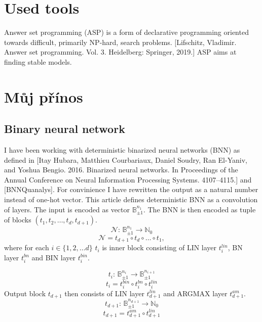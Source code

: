 \documentclass{fithesis}
\newcommand{\BB}{\mathbb{B}}
\newcommand{\NN}{\mathbb{N}}
\newcommand{\BNN}{\mathcal{N}}
\begin{document}
\chapter{Used tools}

Answer set programming (ASP) is a form of declarative
programming oriented towards difficult, primarily NP-hard,
search problems. [Lifschitz, Vladimir. Answer set programming. Vol. 3.
Heidelberg: Springer, 2019.] ASP aims at finding stable models.


\chapter{Můj přínos}

\section{Binary neural network}

I have been working with deterministic binarized neural networks (BNN)
as defined in [Itay Hubara, Matthieu Courbariaux, Daniel Soudry, Ran El-Yaniv, and Yoshua Bengio. 2016. Binarized neural networks. In Proceedings of the Annual Conference on Neural Information Processing Systems. 4107–4115.] and [BNNQuanalys].
For convinience I have rewritten the output as a natural number instead of
one-hot vector.
This article defines deterministic BNN as a convolution of layers.
The input is
encoded as vector $\BB_{\pm 1}^{n_1}$. The BNN is then encoded as tuple of blocks
$(t_1, t_2, \dots, t_d, t_{d+1})$.
\begin{equation*}
    \BNN: \, \BB_{\pm 1}^{n_1} \to \NN_0
\end{equation*}
\begin{equation}
    \BNN = t_{d+1} \circ t_d \circ \dots \circ t_1,
\end{equation}
where for each $i\in \{1, 2, \dots d\}$ $t_i$ is inner block consisting
of LIN layer $t_i^{lin}$, BN layer $t_i^{bn}$ and BIN layer $t_i^{bin}$.

\begin{equation*}
    t_i: \, \BB_{\pm 1}^{n_i} \to \BB_{\pm 1}^{n_{i+1}}
\end{equation*}
\begin{equation}
    t_i = t_i^{bin} \circ t_i^{bn} \circ t_i^{lin}
\end{equation}
Output block $t_{d+1}$ then consists of LIN layer $t_{d+1}^{lin}$ and ARGMAX layer
$t_{d+1}^{am}$.
\begin{equation*}
    t_{d+1}: \, \BB_{\pm 1}^{n_{d+1}} \to \NN_0
\end{equation*}
\begin{equation}
    t_{d+1} = t_{d+1}^{am} \circ t_{d+1}^{lin}
\end{equation}
\end{document}
